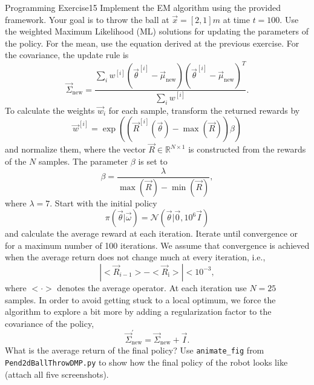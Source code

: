 \begin{questions}
\begin{question}{Programming Exercise}{15}
Implement the EM algorithm using the provided framework. Your goal is to throw the ball at $\vec x = [2,1]m$ at time $t=100$. Use the weighted Maximum Likelihood (ML) solutions for updating the parameters of the policy. For the mean, use the equation derived at the previous exercise. For the covariance, the update rule is 
\begin{equation}
	\vec \Sigma_\mathrm{new} = \frac{\sum_i w^{[i]} (\vec{\theta}^{[i]}-\vec{\mu}_{\mathrm{new}})     (\vec{\theta}^{[i]}-\vec{\mu}_{\mathrm{new}})^T}{\sum_i w^{[i]}}.
\end{equation}
To calculate the weights $\vec{w}_i$ for each sample, transform the returned rewards by 
\begin{equation}
	\vec w^{[i]} = \exp ( ( \vec{R}^{[i]}(\vec{\theta}) - \max(\vec{R}) ) \beta )
\end{equation}
and normalize them, where the vector $\vec R\in \mathbb{R}^{N \times 1}$ is constructed from the rewards of the $N$ samples. The
parameter $\beta$ is set to
\begin{equation}
	\beta = \frac{\lambda}{ \max(\vec{R}) - \min(\vec{R}) },
\end{equation}
where $\lambda = 7$. Start with the initial policy 
\begin{equation}
	\pi(\vec{\theta}|\vec{\omega}) = \mathcal{N}(\vec{\theta}|\vec{0}, 10^6  \vec{I})
\end{equation}
and calculate the average reward at each iteration. Iterate until convergence or for a maximum number of 100 iterations.
We assume that convergence is achieved when the average return does not change much at every iteration, i.e., 
$$ | <\vec{R}_{i-1}> - <\vec{R}_\textrm{i}> | < 10^{-3}, $$
where $<\cdot>$ denotes the average operator.
At each iteration use 
$ N = 25 $ samples. In order to avoid getting stuck to a local optimum, we force the algorithm to explore a bit more by adding a regularization factor to the covariance of the policy,
\begin{equation}
    \vec{\Sigma}_\mathrm{new}^\mathrm{'} = \vec{\Sigma}_\mathrm{new} + \vec{I}.
\end{equation}
What is the average return of the final policy? 
Use \texttt{animate\_fig} from \texttt{Pend2dBallThrowDMP.py} to show how the final policy of the robot looks like (attach all five screenshots).


\end{question}
\end{questions}
